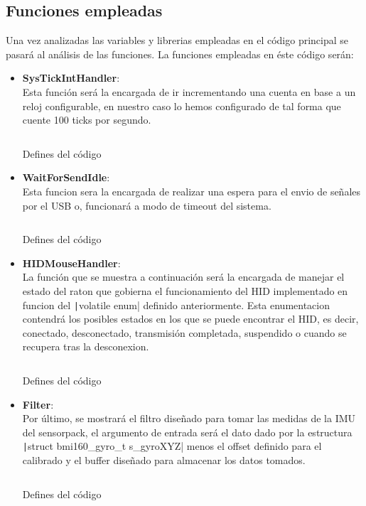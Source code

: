 \documentclass[a4paper,twoside]{article}
\begin{document}
\vspace{3cm}

\subsection{Funciones empleadas}
Una vez analizadas las variables y librerias empleadas en el código principal se pasará al análisis de las funciones. La funciones empleadas en éste código serán:
\begin{itemize}
  \item \textbf{SysTickIntHandler}:\\
Esta función será la encargada de ir incrementando una cuenta en base a un reloj configurable, en nuestro caso lo hemos configurado de tal forma que cuente 100 ticks por segundo.
    \begin{listing}[h!]
    \inputminted[linenos,breaklines,frame=lines,framesep=2mm]{c}{codes/fun_tick.c}
    \caption{Defines del código}
    \end{listing}

\newpage
\item \textbf{WaitForSendIdle}:\\
Esta funcion sera la encargada de realizar una espera para el envio de señales por el USB o, funcionará a modo de timeout del sistema.
  \begin{listing}[h!]
  \inputminted[linenos,breaklines,frame=lines,framesep=2mm]{c}{codes/fun_idle.c}
  \caption{Defines del código}
  \end{listing}

\vspace{4cm}
\item \textbf{HIDMouseHandler}:\\
La función que se muestra a continuación será la encargada de manejar el estado del raton que gobierna el funcionamiento del HID implementado en funcion del \texttt|volatile enum| definido anteriormente. Esta enumentacion contendrá los posibles estados en los que se puede encontrar el HID, es decir, conectado, desconectado, transmisión completada, suspendido o cuando se recupera tras la desconexion. \\
\newpage
  \begin{listing}[h!]
  \inputminted[linenos,breaklines,frame=lines,framesep=2mm]{c}{codes/fun_hid.c}
  \caption{Defines del código}
  \end{listing}
\newpage

\item \textbf{Filter}:\\
Por último, se mostrará el filtro diseñado para tomar las medidas de la IMU del sensorpack, el argumento de entrada será el dato dado por la  estructura \texttt|struct bmi160_gyro_t s_gyroXYZ| menos el offset definido para el calibrado y el buffer diseñado para almacenar los datos tomados.
    \begin{listing}[h!]
    \inputminted[linenos,breaklines,frame=lines,framesep=2mm]{c}{codes/fun_filt.c}
    \caption{Defines del código}
    \end{listing}

\end{itemize}
\end{document}
